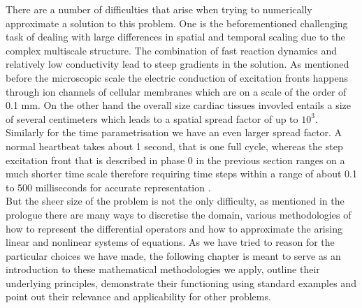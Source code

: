 \documentclass[../draft_1.tex]{subfiles}
\begin{document}
There are a number of difficulties that arise when trying to numerically approximate a solution to this problem. One is the beforementioned challenging task of dealing with large differences in spatial and temporal scaling due to the complex multiscale structure. The combination of fast reaction dynamics and relatively low conductivity lead to steep gradients in the solution. As mentioned before the microscopic scale the electric conduction of excitation fronts happens through ion channels of cellular membranes which are on a scale of the order of 0.1 mm. On the other hand the overall size cardiac tissues invovled entails a size of several centimeters which leads to a spatial spread factor of up to $10^3$. Similarly for the time parametrisation we have an even larger spread factor. A normal heartbeat takes about 1 second, that is one full cycle, whereas the step excitation front that is described in phase 0 in the previous section ranges on a much shorter time scale therefore requiring time steps within a range of about 0.1 to 500 milliseconds for accurate representation \cite{colli2004parallel}.
\smallskip
\\
But the sheer size of the problem is not the only difficulty, as mentioned in the prologue there are many ways to discretise the domain, various methodologies of how to represent the differential operators and how to approximate the arising linear and nonlinear systems of equations. As we have tried to reason for the particular choices we have made, the following chapter is meant to serve as an introduction to these mathematical methodologies we apply, outline their underlying principles, demonstrate their functioning using standard examples and point out their relevance and applicability for other problems.
\end{document}
